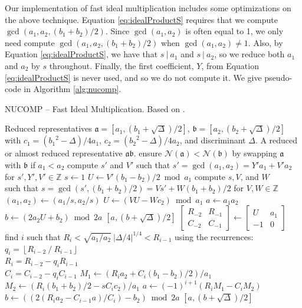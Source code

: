 \documentclass{ucalgthes1}
\theoremstyle{plain}
\theoremstyle{definition}
\newcommand{\ZZ}{\mathbb{Z}}
\newcommand{\matrixtt}[4]{\left[ \begin{array}{rr} #1 & #2 \\ #3 & #4 \end{array} \right]}
\newcommand{\floor}[1]{\left\lfloor #1 \right\rfloor}
\begin{document}
Our implementation of fast ideal multiplication includes some optimizations on the above technique.  Equation \ref{eq:idealProductS} requires that we compute $\gcd(a_1, a_2, (b_1 + b_2)/2)$. Since $\gcd(a_1, a_2)$ is often equal to 1, we only need compute $\gcd(a_1, a_2, (b_1 + b_2)/2)$ when $\gcd(a_1, a_2) \neq 1$. Also, by Equation \ref{eq:idealProductS}, we have that $s ~|~ a_1$ and $s ~|~ a_2$, so we reduce both $a_1$ and $a_2$ by $s$ throughout. Finally, the first coefficient, $Y$, from Equation \ref{eq:idealProductS} is never used, and so we do not compute it. We give pseudo-code in Algorithm \ref{alg:nucomp}. 

\begin{algorithm}[h]
\caption{NUCOMP -- Fast Ideal Multiplication. Based on \cite[pp.441-443]{Jacobson2009}.}
\label{alg:nucomp}
\begin{algorithmic}[1]
\REQUIRE Reduced representatives $\mathfrak a = [a_1, (b_1+\sqrt\Delta)/2]$, $\mathfrak b = [a_2, (b_2+\sqrt\Delta)/2]$ \\ with $c_1 = ({b_1}^2-\Delta)/4a_1$, $c_2 = ({b_2}^2-\Delta)/4a_2$, and discriminant $\Delta$.
\ENSURE A reduced or almost reduced representative $\mathfrak a \mathfrak b$.
\STATE ensure $\mathcal N(\mathfrak a) < \mathcal N(\mathfrak b)$ by swapping $\mathfrak a$ with $\mathfrak b$ if $a_1 < a_2$
\STATE compute $s'$ and $V'$ such that $s' = \gcd(a_1, a_2) = Y'a_1 + V'a_2$ for $s', Y', V' \in \ZZ$
\STATE $s \gets 1$
\STATE $U \gets V'(b_1 - b_2)/2 \bmod a_1$
	\STATE compute $s, V$, and $W$ \\
	       such that $s = \gcd(s', (b_1 + b_2)/2) = Vs' + W(b_1 + b_2)/2$ for $V, W \in \ZZ$
	\STATE $(a_1, a_2) \gets (a_1/s, a_2/s)$
	\STATE $U \gets (VU - Wc_2) \bmod a_1$
\ENDIF
{}
	\STATE $a \gets a_1a_2$
	\STATE $b \gets (2a_2U + b_2) \bmod{2a}$
	\RETURN $[a, (b+\sqrt\Delta)/2]$
\ENDIF
\STATE $\matrixtt{R_{-2}}{R_{-1}}{C_{-2}}{C_{-1}} \gets \matrixtt{U}{a_1}{-1}{0}$
\STATE find $i$ such that $R_i < \sqrt{a_1/a_2} ~ |\Delta/4|^{1/4} < R_{i-1}$ using the recurrences: \\
$q_i = \floor{R_{i-2} ~/~ R_{i-1}}$ \\
$R_i = R_{i-2}-q_i R_{i-1}$ \\
$C_i=C_{i-2}-q_i C_{i-1}$
\STATE $M_1 \gets (R_i a_2 + C_i(b_1-b_2)/2)/a_1$
\STATE $M_2 \gets (R_i (b_1+b_2)/2 -sC_i c_2)/a_1$
\STATE $a \gets (-1)^{i+1}(R_i M_1 - C_i M_2)$
\STATE $b \gets ((2(R_i a_2 - C_{i-1} a)/C_i) - b_2) \bmod{2a}$
\RETURN $[a, (b+\sqrt\Delta)/2]$
\end{algorithmic}
\end{algorithm}
\end{document}
